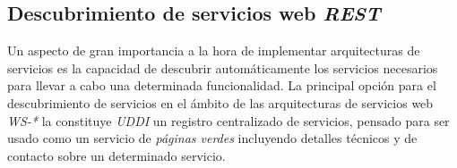 \subsection{Descubrimiento de servicios web \textit{REST}}

Un aspecto de gran importancia a la hora de implementar arquitecturas de servicios es la capacidad de descubrir autom\'aticamente los servicios necesarios para llevar a cabo una determinada funcionalidad. La principal opci\'on para el descubrimiento de servicios en el \'ambito de las arquitecturas de servicios web \textit{WS-*} la constituye \textit{UDDI} un registro centralizado de servicios, pensado para ser usado como un servicio de \textit{p\'aginas verdes} incluyendo detalles t\'ecnicos y de contacto sobre un determinado servicio.\\

